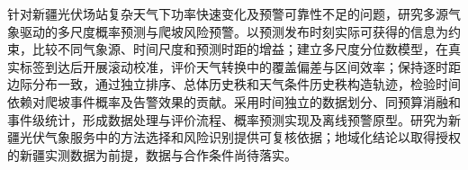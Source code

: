 针对新疆光伏场站复杂天气下功率快速变化及预警可靠性不足的问题，研究多源气象驱动的多尺度概率预测与爬坡风险预警。以预测发布时刻实际可获得的信息为约束，比较不同气象源、时间尺度和预测时距的增益；建立多尺度分位数模型，在真实标签到达后开展滚动校准，评价天气转换中的覆盖偏差与区间效率；保持逐时距边际分布一致，通过独立排序、总体历史秩和天气条件历史秩构造轨迹，检验时间依赖对爬坡事件概率及告警效果的贡献。采用时间独立的数据划分、同预算消融和事件级统计，形成数据处理与评价流程、概率预测实现及离线预警原型。研究为新疆光伏气象服务中的方法选择和风险识别提供可复核依据；地域化结论以取得授权的新疆实测数据为前提，数据与合作条件尚待落实。

